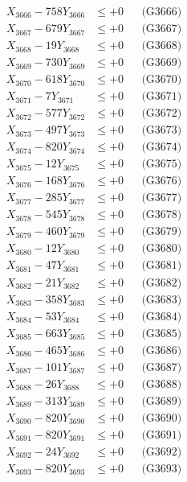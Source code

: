 \documentclass[a4paper,10pt]{article}
\begin{document}
{\begin{align}
X_{3666} - 758Y_{3666} &\leq +0 && \text{(G3666)} \\
X_{3667} - 679Y_{3667} &\leq +0 && \text{(G3667)} \\
X_{3668} - 19Y_{3668} &\leq +0 && \text{(G3668)} \\
X_{3669} - 730Y_{3669} &\leq +0 && \text{(G3669)} \\
X_{3670} - 618Y_{3670} &\leq +0 && \text{(G3670)} \\
\allowbreak
X_{3671} - 7Y_{3671} &\leq +0 && \text{(G3671)} \\
X_{3672} - 577Y_{3672} &\leq +0 && \text{(G3672)} \\
X_{3673} - 497Y_{3673} &\leq +0 && \text{(G3673)} \\
X_{3674} - 820Y_{3674} &\leq +0 && \text{(G3674)} \\
X_{3675} - 12Y_{3675} &\leq +0 && \text{(G3675)} \\
X_{3676} - 168Y_{3676} &\leq +0 && \text{(G3676)} \\
X_{3677} - 285Y_{3677} &\leq +0 && \text{(G3677)} \\
X_{3678} - 545Y_{3678} &\leq +0 && \text{(G3678)} \\
X_{3679} - 460Y_{3679} &\leq +0 && \text{(G3679)} \\
X_{3680} - 12Y_{3680} &\leq +0 && \text{(G3680)} \\
\allowbreak
X_{3681} - 47Y_{3681} &\leq +0 && \text{(G3681)} \\
X_{3682} - 21Y_{3682} &\leq +0 && \text{(G3682)} \\
X_{3683} - 358Y_{3683} &\leq +0 && \text{(G3683)} \\
X_{3684} - 53Y_{3684} &\leq +0 && \text{(G3684)} \\
X_{3685} - 663Y_{3685} &\leq +0 && \text{(G3685)} \\
X_{3686} - 465Y_{3686} &\leq +0 && \text{(G3686)} \\
X_{3687} - 101Y_{3687} &\leq +0 && \text{(G3687)} \\
X_{3688} - 26Y_{3688} &\leq +0 && \text{(G3688)} \\
X_{3689} - 313Y_{3689} &\leq +0 && \text{(G3689)} \\
X_{3690} - 820Y_{3690} &\leq +0 && \text{(G3690)} \\
\allowbreak
X_{3691} - 820Y_{3691} &\leq +0 && \text{(G3691)} \\
X_{3692} - 24Y_{3692} &\leq +0 && \text{(G3692)} \\
X_{3693} - 820Y_{3693} &\leq +0 && \text{(G3693)} \\

\end{align}}
\end{document}
